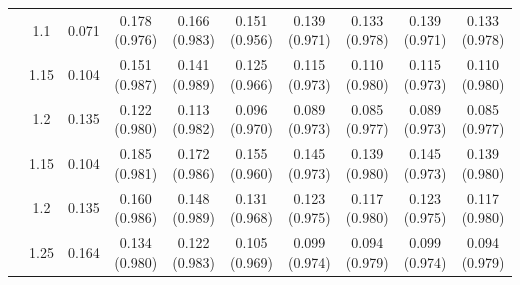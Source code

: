 \begin{tabular}{c c c c c c c c c c}
\addlinespace
3 & 1.1 & 0.071 & 0.178 (0.976) & 0.166 (0.983) & 0.151 (0.956) & 0.139 (0.971) & 0.133 (0.978) & 0.139 (0.971) & 0.133 (0.978) \\
 & 1.15 & 0.104 & 0.151 (0.987) & 0.141 (0.989) & 0.125 (0.966) & 0.115 (0.973) & 0.110 (0.980) & 0.115 (0.973) & 0.110 (0.980) \\
 & 1.2 & 0.135 & 0.122 (0.980) & 0.113 (0.982) & 0.096 (0.970) & 0.089 (0.973) & 0.085 (0.977) & 0.089 (0.973) & 0.085 (0.977) \\
\addlinespace
3.5 & 1.15 & 0.104 & 0.185 (0.981) & 0.172 (0.986) & 0.155 (0.960) & 0.145 (0.973) & 0.139 (0.980) & 0.145 (0.973) & 0.139 (0.980) \\
 & 1.2 & 0.135 & 0.160 (0.986) & 0.148 (0.989) & 0.131 (0.968) & 0.123 (0.975) & 0.117 (0.980) & 0.123 (0.975) & 0.117 (0.980) \\
 & 1.25 & 0.164 & 0.134 (0.980) & 0.122 (0.983) & 0.105 (0.969) & 0.099 (0.974) & 0.094 (0.979) & 0.099 (0.974) & 0.094 (0.979) \\
\bottomrule
\end{tabular}
